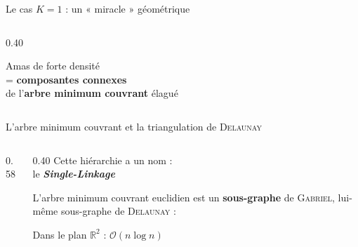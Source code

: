 \begin{frame}{Le cas $K = 1$ : un « miracle » géométrique}
\begin{columns}[c, onlytextwidth]
\begin{column}{0.40\textwidth}
{\begin{center}
                    \vspace{1.0cm}

                    Amas de forte densité\\
                    = \textbf{composantes connexes}\\ de l'\textbf{arbre minimum couvrant} élagué
                \end{center}
            }
        \end{column}
    \end{columns}
\end{frame}

\begin{frame}{L'arbre minimum couvrant et la triangulation de \textsc{Delaunay}}
    \begin{columns}[c, onlytextwidth]
        \begin{column}{0.58\textwidth}
            \begin{center}
                
            \end{center}
        \end{column}

        \begin{column}{0.40\textwidth}
            Cette hiérarchie a un nom :\\ le \textbf{\emph{Single-Linkage}}  

            \vspace{0.40cm}
            L'arbre minimum couvrant euclidien est un \textbf{sous-graphe} de \textsc{Gabriel},
            lui-même sous-graphe de \textsc{Delaunay}  :
            \begin{center}
            \end{center}

            \vspace{0.30cm}
            Dans le plan $\mathbb{R}^2$ : $\mathcal{O}(n \log n)$
        \end{column}
    \end{columns}
\end{frame}

